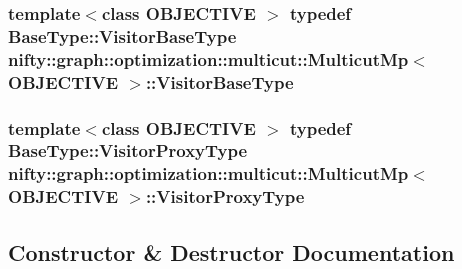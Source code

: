 \subsubsection[{Visitor\+Base\+Type}]{\setlength{\rightskip}{0pt plus 5cm}template$<$class O\+B\+J\+E\+C\+T\+I\+V\+E $>$ typedef {\bf Base\+Type\+::\+Visitor\+Base\+Type} {\bf nifty\+::graph\+::optimization\+::multicut\+::\+Multicut\+Mp}$<$ O\+B\+J\+E\+C\+T\+I\+V\+E $>$\+::{\bf Visitor\+Base\+Type}}\label{classnifty_1_1graph_1_1optimization_1_1multicut_1_1MulticutMp_ac0c55da1b0da06e56bc164f256e811e9}
\hypertarget{classnifty_1_1graph_1_1optimization_1_1multicut_1_1MulticutMp_a5b2de2a593f41a26245d5c6d1514b94a}{}
\subsubsection[{Visitor\+Proxy\+Type}]{\setlength{\rightskip}{0pt plus 5cm}template$<$class O\+B\+J\+E\+C\+T\+I\+V\+E $>$ typedef {\bf Base\+Type\+::\+Visitor\+Proxy\+Type} {\bf nifty\+::graph\+::optimization\+::multicut\+::\+Multicut\+Mp}$<$ O\+B\+J\+E\+C\+T\+I\+V\+E $>$\+::{\bf Visitor\+Proxy\+Type}}\label{classnifty_1_1graph_1_1optimization_1_1multicut_1_1MulticutMp_a5b2de2a593f41a26245d5c6d1514b94a}


\subsection{Constructor \& Destructor Documentation}
\hypertarget{classnifty_1_1graph_1_1optimization_1_1multicut_1_1MulticutMp_a0d0ee4daf0173097d53f057651393c2b}{}
